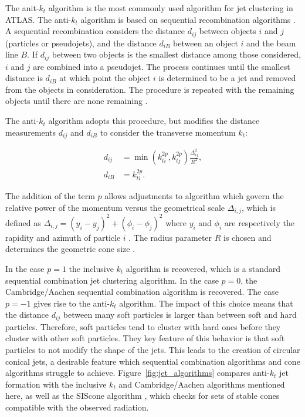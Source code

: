 The anit-$k_t$ algorithm is the most commonly used algorithm for jet clustering in ATLAS. The anti-$k_t$ algorithm is based on sequential recombination algorithms \cite{seq_comb_alg}. A sequential recombination considers the distance $d_{ij}$ between objects $i$ and $j$ (particles or pseudojets), and the distance $d_{iB}$ between an object $i$ and the beam line $B$. If $d_{ij}$ between two objects is the smallest distance among those considered, $i$ and $j$ are combined into a pseudojet. The process continues until the smallest distance is $d_{iB}$ at which point the object $i$ is determined to be a jet and removed from the objects in consideration. The procedure is repeated with the remaining objects until there are none remaining \cite{anti_kt}. \par

The anti-$k_t$ algorithm adopts this procedure, but modifies the distance measurements $d_{ij}$ and $d_{iB}$ to consider the transverse momentum $k_t$:

\begin{subequations}
       	\begin{align}
		d_{ij} &= \min{(k_{ti}^{2p},k_{tj}^{2p})}\frac{\Delta_{ij}^{2}}{R^2}, \\
		d_{iB} &= k_{ti}^{2p} .
	\end{align}
\end{subequations}

The addition of the term $p$ allows adjustments to algorithm which govern the relative power of the momentum versus the geometrical scale $\Delta_{i,j}$, which is defined as $\Delta_{i,j} = (y_i - y_j)^2 + (\phi_i - \phi_j)^2$ where $y_i$ and $\phi_i$ are respectively the rapidity and azimuth of particle $i$ \cite{anti_kt}. The radius parameter $R$ is chosen and determines the geometric cone size \cite{seq_comb_alg}. \par

In the case $p=1$ the inclusive $k_t$ algorithm \cite{seq_comb_alg} is recovered, which is a standard sequential combination jet clustering algorithm. In the case $p=0$, the Cambridge/Aachen sequential combination algorithm \cite{aachen} is recovered. The case $p=-1$ gives rise to the anti-$k_t$ algorithm. The impact of this choice means that the distance $d_{ij}$ between many soft particles is larger than between soft and hard particles. Therefore, soft particles tend to cluster with hard ones before they cluster with other soft particles. They key feature of this behavior is that soft particles to not modify the shape of the jets. This leads to the creation of circular conical jets, a desirable feature which sequential combination algorithms and cone algorithms struggle to achieve. Figure~\ref{fig:jet_algorithms} compares anti-$k_t$ jet formation with the inclusive $k_t$ and Cambridge/Aachen algorithms mentioned here, as well as the SIScone algorithm \cite{siscone}, which checks for sets of stable cones compatible with the observed radiation. \par

